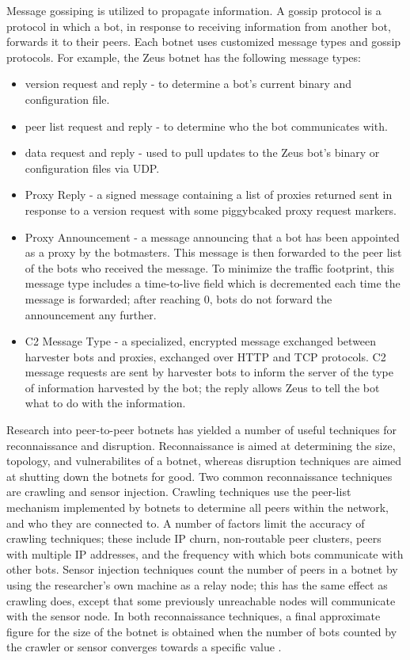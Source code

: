 \documentclass{acm_proc_article-sp}
\begin{document}
Message gossiping is utilized to propagate information\cite{stone:p2p}. A gossip protocol is a protocol in which a bot, in response to receiving information from another bot, forwards it to their peers. Each botnet uses customized message types and gossip protocols. For example, the Zeus botnet has the following message types:\cite{zeus:protocol}
\begin{itemize}
\item version request and reply - to determine a bot's current binary and configuration file\cite{zeus:protocol}.
\item peer list request and reply - to determine who the bot communicates with\cite{zeus:protocol}.
\item data request and reply - used to pull updates to the Zeus bot's binary or configuration files via UDP\cite{zeus:protocol}.
\item Proxy Reply - a signed message containing a list of proxies returned sent in response to a version request with some piggybcaked proxy request markers\cite{zeus:protocol}.
\item Proxy Announcement - a message announcing that a bot has been appointed as a proxy by the botmasters.  This message is then forwarded to the peer list of the bots who received the message.  To minimize the traffic footprint, this message type includes a time-to-live field which is decremented each time the message is forwarded; after reaching 0, bots do not forward the announcement any further\cite{zeus:protocol}.
\item C2 Message Type - a specialized, encrypted message exchanged between harvester bots and proxies, exchanged over HTTP and TCP protocols.  C2 message requests are sent by harvester bots to inform the server of the type of information harvested by the bot; the reply allows Zeus to tell the bot what to do with the information\cite{zeus:protocol}.
\end{itemize}

Research into peer-to-peer botnets has yielded a number of useful techniques for reconnaissance and disruption.  Reconnaissance is aimed at determining the size, topology, and vulnerabilites of a botnet, whereas disruption techniques are aimed at shutting down the botnets for good.  Two common reconnaissance techniques are crawling and sensor injection.  Crawling techniques use the peer-list mechanism implemented by botnets to determine all peers within the network, and who they are connected to. A number of factors limit the accuracy of crawling techniques; these include IP churn, non-routable peer clusters, peers with multiple IP addresses, and the frequency with which bots communicate with other bots.  Sensor injection techniques count the number of peers in a botnet by using the researcher's own machine as a relay node; this has the same effect as crawling does, except that some previously unreachable nodes will communicate with the sensor node.  In both reconnaissance techniques, a final approximate figure for the size of the botnet is obtained when the number of bots counted by the crawler or sensor converges towards a specific value \cite{stone:p2p}\cite{defcon:prowling}.
\end{document}
